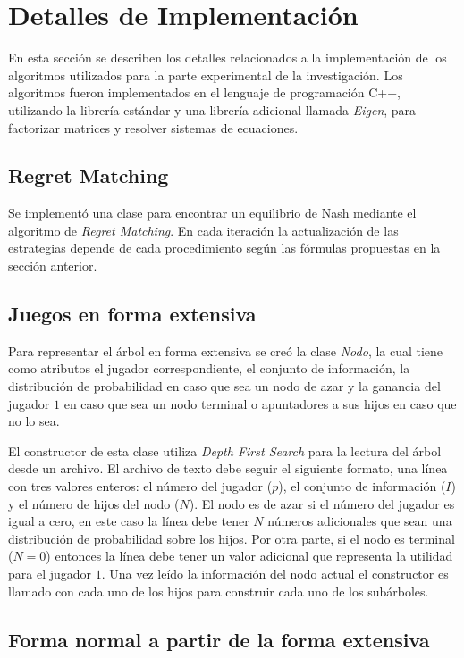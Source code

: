 \section{Detalles de Implementación}

En esta sección se describen los detalles relacionados a la implementación de los algoritmos utilizados para la parte experimental de la investigación. Los algoritmos fueron implementados en el lenguaje de programación C++, utilizando la librería estándar y una librería adicional llamada \textit{Eigen}, para factorizar matrices y resolver sistemas de ecuaciones.

\subsection{Regret Matching}
Se implementó una clase para encontrar un equilibrio de Nash mediante el algoritmo de \textit{Regret Matching}. En cada iteración la actualización de las estrategias depende de cada procedimiento según las fórmulas propuestas en la sección anterior.

\subsection{Juegos en forma extensiva}

Para representar el árbol en forma extensiva se creó la clase \textit{Nodo}, la cual tiene como atributos el jugador correspondiente, el conjunto de información, la distribución de probabilidad en caso que sea un nodo de azar y la ganancia del jugador $1$ en caso que sea un nodo terminal o apuntadores a sus hijos en caso que no lo sea.

El constructor de esta clase utiliza \textit{Depth First Search} para la lectura del árbol desde un archivo. El archivo de texto debe seguir el siguiente formato, una línea con tres valores enteros: el número del jugador ($p$), el conjunto de información ($I$) y el número de hijos del nodo ($N$). El nodo es de azar si el número del jugador es igual a cero, en este caso la línea debe tener $N$ números adicionales que sean una distribución de probabilidad sobre los hijos. Por otra parte, si el nodo es terminal ($N = 0$) entonces la línea debe tener un valor adicional que representa la utilidad para el jugador $1$. Una vez leído la información del nodo actual el constructor es llamado con cada uno de los hijos para construir cada uno de los subárboles.

\subsection{Forma normal a partir de la forma extensiva}
\label{subsec:FN-FE}

